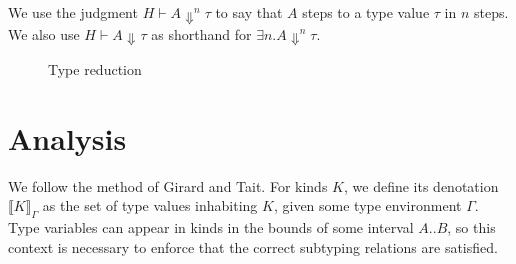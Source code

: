 \documentclass[a4paper, 10pt]{article}
\newcommand{\interval}[2]{#1 .. #2}
\newcommand{\isval}[1]{#1\ \texttt{val}}
\newcommand{\stepsn}[1][]{\Downarrow^{#1}}
\newcommand{\KDenot}[2][\Gamma]{\llbracket #2 \rrbracket_{#1}}
\begin{document}
We use the judgment $H \vdash A \stepsn[n] \tau$ to say that $A$ steps to a
type value $\tau$ in $n$ steps. We also use $H \vdash A \stepsn \tau$ as
shorthand for $\exists n . A \stepsn[n] \tau$.

\begin{figure}[ht]

  \caption{Type reduction}
\end{figure}

\section{Analysis}

We follow the method of Girard and Tait. For kinds $K$, we define its
denotation $\KDenot{K}$ as the set of type values inhabiting $K$, given some
type environment $\Gamma$. Type variables can appear in kinds in the bounds of
some interval $\interval{A}{B}$, so this context is necessary to enforce that
the correct subtyping relations are satisfied.
\end{document}
